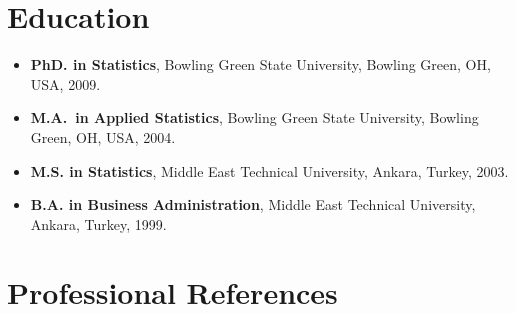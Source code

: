 \documentclass[11pt,a4paper,]{moderncv}
\providecommand{\tightlist}{%
	\setlength{\itemsep}{0pt}\setlength{\parskip}{0pt}}
\begin{document}
\section{Education}\label{education}

\begin{itemize}
\tightlist
\item
  \textbf{PhD. in Statistics}, Bowling Green State University, Bowling
  Green, OH, USA, 2009.
\item
  \textbf{M.A.~in Applied Statistics}, Bowling Green State University,
  Bowling Green, OH, USA, 2004.
\item
  \textbf{M.S. in Statistics}, Middle East Technical University, Ankara,
  Turkey, 2003.
\item
  \textbf{B.A. in Business Administration}, Middle East Technical
  University, Ankara, Turkey, 1999.
\end{itemize}

\section{Professional References}\label{professional-references}
\end{document}
